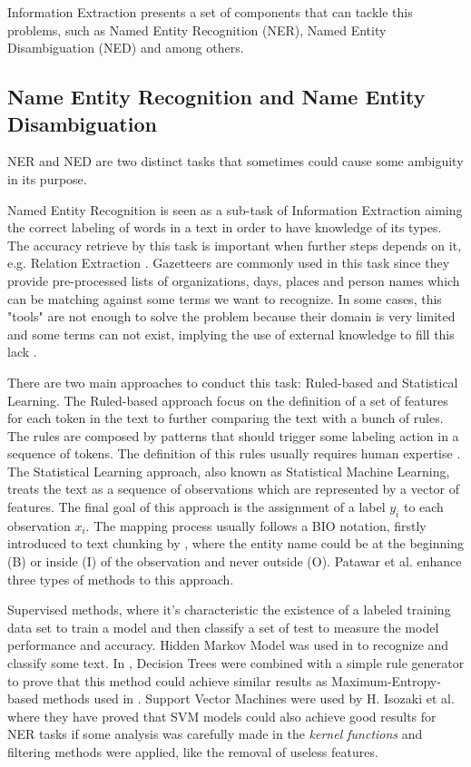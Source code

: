 Information Extraction presents a set of components that can tackle this problems, such as Named Entity Recognition (NER), Named Entity Disambiguation (NED) and among others.

\subsection{Name Entity Recognition and Name Entity Disambiguation}
NER and NED are two distinct tasks that sometimes could cause some ambiguity in its purpose.

Named Entity Recognition is seen as a sub-task of Information Extraction aiming the correct labeling of words in a text in order to have knowledge of its types. The accuracy retrieve by this task is important when further steps depends on it, e.g. Relation Extraction \cite{kn:Aggarwal2012}. Gazetteers are commonly used in this task since they provide pre-processed lists of organizations, days, places and person names which can be matching against some terms we want to recognize. In some cases, this "tools" are not enough to solve the problem because their domain is very limited and some terms can not exist, implying the use of external knowledge to fill this lack \cite{kn:Ratinov2009}.

There are two main approaches to conduct this task: Ruled-based and Statistical Learning. The Ruled-based approach focus on the definition of a set of features for each token in the text to further comparing the text with a bunch of rules. The rules are composed by patterns that should trigger some labeling action in a sequence of tokens. The definition of this rules usually requires human expertise \cite{kn:Aggarwal2012}. 
The Statistical Learning approach, also known as Statistical Machine Learning, 
treats the text as a sequence of observations which are represented by a vector of features. The final goal of this approach is the assignment of a label $y_{i}$ to each observation $x_{i}$. The mapping process usually follows a BIO notation, firstly introduced to text chunking by \cite{kn:Ramshaw1999}, where the entity name could be at the beginning (B) or inside (I) of the observation and never outside (O). Patawar et al. \cite{kn:Patawar2015} enhance three types of methods to this approach.

Supervised methods, where it's characteristic the existence of a labeled training data set to train a model and then classify a set of test to measure the model performance and accuracy. Hidden Markov Model was used in \cite{kn:Bikel1999} to recognize and classify some text. In \cite{kn:Isozaki2001}, Decision Trees were combined with a simple rule generator to prove that this method could achieve similar results as Maximum-Entropy-based methods used in \cite{kn:Borthwick1999}. Support Vector Machines were used by H. Isozaki et al. \cite{kn:Isozaki2002} where they have proved that SVM models could also achieve good results for NER tasks if some analysis was carefully made in the \textit{kernel functions} and filtering methods were applied, like the removal of useless features.

